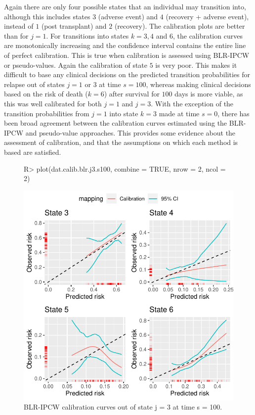 \documentclass[article,shortnames]{jss}
\begin{document}
Again there are only four possible states that an individual may transition into, although this includes states $3$ (adverse event) and $4$ (recovery + adverse event), instead of $1$ (post transplant) and $2$ (recovery). The calibration plots are better than for $j = 1$. For transitions into states $k = 3, 4$ and $6$, the calibration curves are monotonically increasing and the confidence interval contains the entire line of perfect calibration. This is true when calibration is assessed using BLR-IPCW or pseudo-values. Again the calibration of state $5$ is very poor. This makes it difficult to base any clinical decisions on the predicted transition probabilities for relapse out of states $j = 1$ or $3$ at time $s = 100$, whereas making clinical decisions based on the risk of death ($k = 6$) after survival for $100$ days is more viable, as this was well calibrated for both $j = 1$ and $j = 3$. With the exception of the transition probabilities from $j = 1$ into state $k = 3$ made at time $s = 0$, there has been broad agreement between the calibration curves estimated using the BLR-IPCW and pseudo-value approaches. This provides some evidence about the assessment of calibration, and that the assumptions on which each method is based are satisfied.

\begin{figure}
\centering
\begin{Schunk}
\begin{Sinput}
R> plot(dat.calib.blr.j3.s100, combine = TRUE, nrow = 2, ncol = 2)
\end{Sinput}
\end{Schunk}
\includegraphics{calibmsm-jss-TEST-015}
\caption{\label{fig:blrj3s100} BLR-IPCW calibration curves out of state j =  3 at time s = 100.}
\end{figure}
\end{document}
